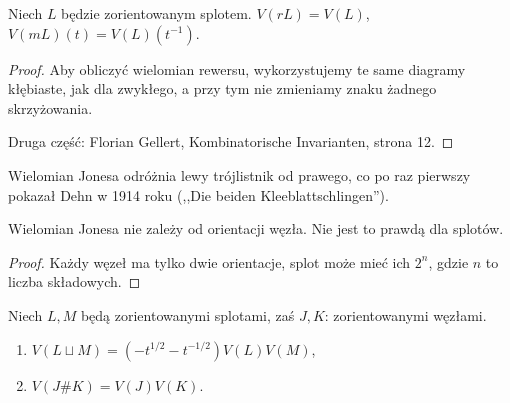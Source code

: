 \begin{proposition}
    Niech $L$ będzie zorientowanym splotem.
    $V(rL)=V(L)$, $V(mL)(t)=V(L)(t^{-1})$.
\end{proposition}

\begin{proof}
    Aby obliczyć wielomian rewersu, wykorzystujemy te same diagramy kłębiaste,
    jak dla zwykłego, a przy tym nie zmieniamy znaku żadnego skrzyżowania.

    Druga część: Florian Gellert, Kombinatorische Invarianten, strona 12.
\end{proof}

Wielomian Jonesa odróżnia lewy trójlistnik od prawego, co po raz pierwszy pokazał Dehn w 1914 roku (,,Die beiden Kleeblattschlingen'').

\begin{corollary}
    Wielomian Jonesa nie zależy od orientacji węzła.
    Nie jest to prawdą dla splotów.
\end{corollary}

\begin{proof}
    Każdy węzeł ma tylko dwie orientacje, splot może mieć ich $2^n$, gdzie $n$ to liczba składowych.
\end{proof}

\begin{proposition}
    Niech $L, M$ będą zorientowanymi splotami, zaś $J, K$: zorientowanymi węzłami.
    \begin{enumerate}
        \item $V(L \sqcup M) = (-t^{1/2} - t^{-1/2}) V(L) V(M)$,
        \item $V(J \# K) = V(J) V(K)$.
    \end{enumerate}
\end{proposition}

